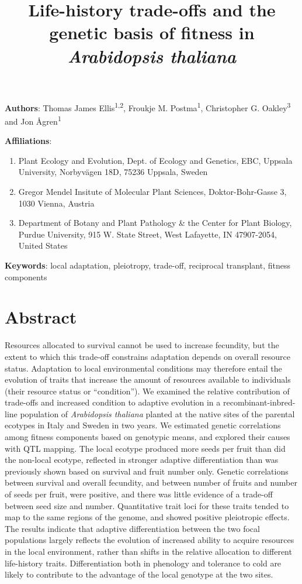 \documentclass[
]{article}
\title{Life-history trade-offs and the genetic basis of fitness in \emph{Arabidopsis thaliana}}
\author{}
\date{\vspace{-2.5em}}
\providecommand{\tightlist}{%
  \setlength{\itemsep}{0pt}\setlength{\parskip}{0pt}}
\begin{document}
\maketitle

\textbf{Authors}: Thomas James Ellis\textsuperscript{1,2}, Froukje M. Postma\textsuperscript{1}, Christopher G. Oakley\textsuperscript{3} and Jon Ågren\textsuperscript{1}

\textbf{Affiliations}:

\begin{enumerate}
\def\labelenumi{\arabic{enumi}.}
\tightlist
\item
  Plant Ecology and Evolution, Dept. of Ecology and Genetics, EBC, Uppsala University, Norbyvägen 18D, 75236 Uppsala, Sweden
\item
  Gregor Mendel Insitute of Molecular Plant Sciences, Doktor-Bohr-Gasse 3, 1030 Vienna, Austria
\item
  Department of Botany and Plant Pathology \& the Center for Plant Biology, Purdue University, 915 W. State Street, West Lafayette, IN 47907-2054, United States
\end{enumerate}

\textbf{Keywords}: local adaptation, pleiotropy, trade-off, reciprocal transplant, fitness components

\newpage

\hypertarget{abstract}{%
\section{Abstract}\label{abstract}}

Resources allocated to survival cannot be used to increase fecundity, but the extent to which this trade-off constrains adaptation depends on overall resource status. Adaptation to local environmental conditions may therefore entail the evolution of traits that increase the amount of resources available to individuals (their resource status or ``condition''). We examined the relative contribution of trade-offs and increased condition to adaptive evolution in a recombinant-inbred-line population of \emph{Arabidopsis thaliana} planted at the native sites of the parental ecotypes in Italy and Sweden in two years. We estimated genetic correlations among fitness components based on genotypic means, and explored their causes with QTL mapping. The local ecotype produced more seeds per fruit than did the non-local ecotype, reflected in stronger adaptive differentiation than was previously shown based on survival and fruit number only. Genetic correlations between survival and overall fecundity, and between number of fruits and number of seeds per fruit, were positive, and there was little evidence of a trade-off between seed size and number. Quantitative trait loci for these traits tended to map to the same regions of the genome, and showed positive pleiotropic effects. The results indicate that adaptive differentiation between the two focal populations largely reflects the evolution of increased ability to acquire resources in the local environment, rather than shifts in the relative allocation to different life-history traits. Differentiation both in phenology and tolerance to cold are likely to contribute to the advantage of the local genotype at the two sites.
\end{document}
